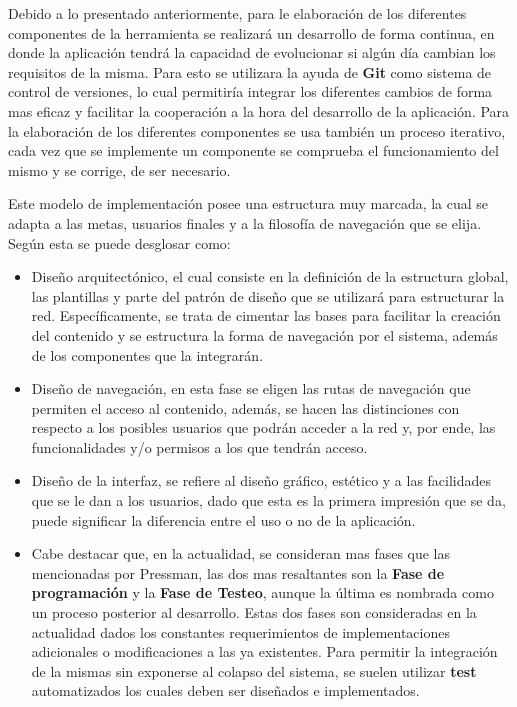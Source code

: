 Debido a lo presentado anteriormente, para le elaboración de los diferentes
componentes de la herramienta se realizará un desarrollo de forma continua,
en donde la aplicación tendrá la capacidad de evolucionar si algún día
cambian los requisitos de la misma. Para esto se utilizara la ayuda de
\textbf{Git} como sistema de control de versiones, lo cual permitiría integrar
los diferentes cambios de forma mas eficaz y facilitar la cooperación a la
hora del desarrollo de la aplicación. Para la elaboración de los diferentes
componentes se usa también un proceso iterativo, cada vez que se implemente
un componente se comprueba el funcionamiento del mismo y se corrige, de ser
necesario.

Este modelo de implementación posee una estructura muy marcada, la cual se adapta
a las metas, usuarios finales y a la filosofía de navegación que se elija.
Según \cite{pressman2002} esta se puede desglosar como:

\begin{itemize}
    \item Diseño arquitectónico, el cual consiste en la definición de la
        estructura global, las plantillas y parte del patrón de diseño que se
        utilizará para estructurar la red. Específicamente, se trata de cimentar
        las bases para facilitar la creación del contenido y se estructura la
        forma de navegación por el sistema, además de los componentes que la
        integrarán.

    \item Diseño de navegación, en esta fase se eligen las rutas de navegación
        que permiten el acceso al contenido, además, se hacen las distinciones
        con respecto a los posibles usuarios que podrán acceder a la red y,
        por ende, las funcionalidades y/o permisos a los que tendrán acceso.

    \item Diseño de la interfaz, se refiere al diseño gráfico, estético y a
        las facilidades que se le dan a los usuarios, dado que esta es la primera
        impresión que se da, puede significar la diferencia entre el uso o no de
        la aplicación.

    \item Cabe destacar que, en la actualidad, se consideran mas fases que las
        mencionadas por Pressman, las dos mas resaltantes son la
        \textbf{Fase de programación} y la \textbf{Fase de Testeo}, aunque la
        última es nombrada como un proceso posterior al desarrollo. Estas dos
        fases son consideradas en la actualidad dados los constantes requerimientos
        de implementaciones adicionales o modificaciones a las ya existentes.
        Para permitir la integración de la mismas sin exponerse al colapso del
        sistema, se suelen utilizar \textbf{test} automatizados los cuales deben
        ser diseñados e implementados.

\end{itemize}
